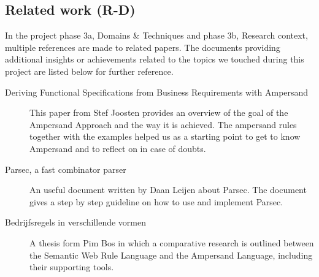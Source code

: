 
\subsection{Related work (R-D)}
In the project phase 3a, Domains \& Techniques and phase 3b, Research context, multiple references are made to related papers.
The documents providing additional insights or achievements related to the topics we touched during this project are listed below for further reference.

\begin{description}
  \item[Deriving Functional Specifications from Business Requirements with Ampersand]
    This paper  from Stef Joosten provides an overview of the goal of the Ampersand Approach and the way it is achieved. 
    The ampersand rules together with the examples helped us as a starting point to get to know Ampersand and to  reflect on in case of doubts.
  \item[Parsec, a fast combinator parser]
    An useful document written by Daan Leijen about Parsec. The document gives a step by step guideline on how to use and implement Parsec.
  \item[Bedrijfsregels in verschillende vormen]
    A thesis  form Pim Bos in which a comparative research is outlined between the Semantic Web Rule Language and the Ampersand Language, including their supporting tools.
\end{description}
